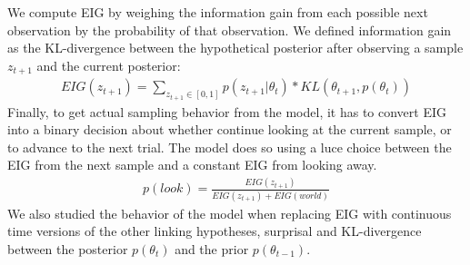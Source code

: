 \documentclass[
]{article}
\begin{document}
We compute EIG by weighing the information gain from each possible next observation by the probability of that observation. We defined information gain as the KL-divergence between the hypothetical posterior after observing a sample \(z_{t+1}\) and the current posterior:
\begin{eqnarray}
EIG(z_{t+1}) = \sum_{z_{t+1} \in [0,1]} p(z_{t+1}|\theta_t) * KL(\theta_{t+1}, p(\theta_t))
\end{eqnarray}
Finally, to get actual sampling behavior from the model, it has to convert EIG into a binary decision about whether continue looking at the current sample, or to advance to the next trial. The model does so using a luce choice between the EIG from the next sample and a constant EIG from looking away.
\begin{eqnarray}
p(look) = \frac{EIG(z_{t+1})}{EIG(z_{t+1})+EIG(world)}
\end{eqnarray}
We also studied the behavior of the model when replacing EIG with continuous time versions of the other linking hypotheses, surprisal and KL-divergence between the posterior \(p(\theta_t)\) and the prior \(p(\theta_{t-1})\).
\end{document}

